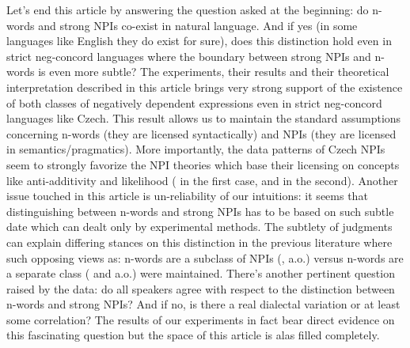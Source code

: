 \documentclass[12pt]{scrartcl}
\begin{document}
Let's end this article by answering the question asked at the beginning: do  n-words and strong NPIs co-exist in natural language. And if yes (in some languages like English they do exist for sure), does this distinction hold even in strict neg-concord languages where the boundary between strong NPIs and n-words is even more subtle? The experiments, their results and their theoretical interpretation described in this article brings very strong support of the existence of both classes of negatively dependent expressions even in strict neg-concord languages like Czech. This result allows us to maintain the standard assumptions concerning n-words (they are licensed syntactically) and   NPIs (they are licensed in semantics/pragmatics). More importantly, the data patterns of Czech NPIs seem to strongly favorize the NPI theories which base their licensing on concepts like  anti-additivity and likelihood (\citealt{zwarts1998three} in the first case, \citealt{heim1984note} and \citealt{crnivc2014against} in the second). Another issue touched in this article is un-reliability of our intuitions: it seems that distinguishing between n-words and strong NPIs has to be based on such subtle date which can dealt only by experimental methods. The subtlety of judgments can explain differing stances on this distinction in the previous literature where such opposing views as: n-words are a subclass of NPIs (\citealt{ladusaw1992expressing}, \citealt{fualuaus2016fragment} a.o.) versus n-words are a separate class (\citealt{zeijlstra2008negative} and \citealt{giannakidou2017landscape} a.o.) were maintained. There's another pertinent question raised by the data: do all speakers agree with respect to the distinction between n-words and strong NPIs? And if no, is there a real dialectal variation or at least some correlation? The results of our experiments in fact bear direct evidence on this fascinating question  but the space of this article is alas filled completely.



\end{document}
